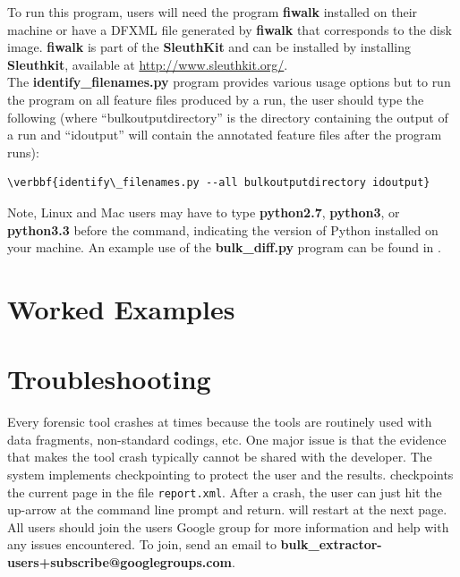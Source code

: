 \documentclass[11pt]{article} %
\begin{document}
To run this program, users will need the program \textbf{fiwalk} installed on their machine or have a DFXML file generated by \textbf{fiwalk} that corresponds to the disk image. \textbf{fiwalk} is part of the \textbf{SleuthKit} and can be installed by installing \textbf{Sleuthkit}, available at \url{http://www.sleuthkit.org/}.\\

The \textbf{identify\_filenames.py} program provides various usage options but to run the program on all feature files produced by a \bulk run, the user should type the following (where ``bulkoutputdirectory'' is the directory containing the output of a \bulk run and ``idoutput'' will contain the annotated feature files after the program runs):
\begin{Verbatim}[commandchars=\\\{\}]
\verbbf{identify\_filenames.py --all bulkoutputdirectory idoutput}
\end{Verbatim} 
Note, Linux and Mac users may have to type \textbf{python2.7}, \textbf{python3}, or \textbf{python3.3} before the command, indicating the version of Python installed on your machine.  An example use of the \textbf{bulk\_diff.py} program can be found in .

\section{Worked Examples}
\label{Examples}


\section{Troubleshooting}
\label{DebuggingBulk}
Every forensic tool crashes at times because the tools are routinely used with data fragments, non-standard codings, etc. One major issue is that the evidence that makes the tool crash typically cannot be shared with the developer. The \bulk system implements checkpointing to protect the user and the results. \bulk checkpoints the current page in the file \texttt{report.xml}. After a crash, the user can just hit the up-arrow at the command line prompt and return. \bulk will restart at the next page. \\

All \bulk users should join the \bulk users Google group for more information and help with any issues encountered. To join, send an email to \textbf{bulk\_extractor-users+subscribe@googlegroups.com}.  \\
\end{document}
